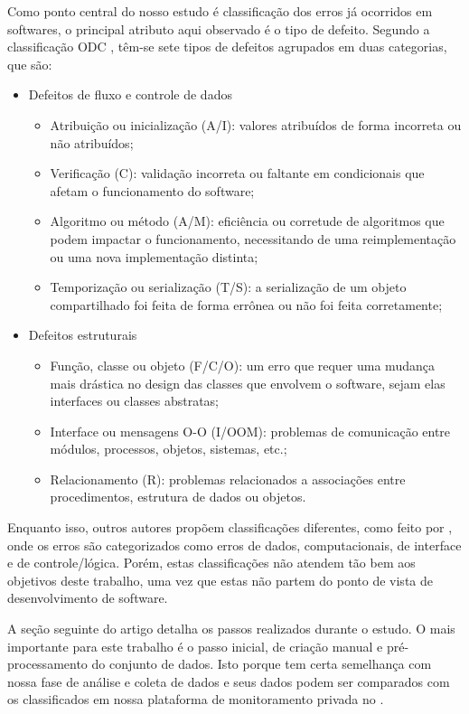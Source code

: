 Como ponto central do nosso estudo é classificação dos erros já ocorridos em softwares, o principal atributo aqui observado é o tipo de defeito. Segundo a classificação ODC \cite{ibm_odc}, têm-se sete tipos de defeitos agrupados em duas categorias, que são:

\begin{itemize}
    \item Defeitos de fluxo e controle de dados
    \begin{itemize}
        \item Atribuição ou inicialização (A/I): valores atribuídos de forma incorreta ou não atribuídos;
        \item Verificação (C): validação incorreta ou faltante em condicionais que afetam o funcionamento do software;
        \item Algoritmo ou método (A/M): eficiência ou corretude de algoritmos que podem impactar o funcionamento, necessitando de uma reimplementação ou uma nova implementação distinta;
        \item Temporização ou serialização (T/S): a serialização de um objeto compartilhado foi feita de forma errônea ou não foi feita corretamente;
    \end{itemize}
    \item Defeitos estruturais
    \begin{itemize}
        \item Função, classe ou objeto (F/C/O): um erro que requer uma mudança mais drástica no design das classes que envolvem o software, sejam elas interfaces ou classes abstratas;
        \item Interface ou mensagens O-O (I/OOM): problemas de comunicação entre módulos, processos, objetos, sistemas, etc.;
        \item Relacionamento (R): problemas relacionados a associações entre procedimentos, estrutura de dados ou objetos.
    \end{itemize}
\end{itemize}

Enquanto isso, outros autores propõem classificações diferentes, como feito por \cite{ast_based_aproach_to_classifying_defects}, onde os erros são categorizados como erros de dados, computacionais, de interface e de controle/lógica. Porém, estas classificações não atendem tão bem aos objetivos deste trabalho, uma vez que estas não partem do ponto de vista de desenvolvimento de software.

A seção seguinte do artigo detalha os passos realizados durante o estudo. O mais importante para este trabalho é o passo inicial, de criação manual e pré-processamento do conjunto de dados. Isto porque tem certa semelhança com nossa fase de análise e coleta de dados e seus dados podem ser comparados com os classificados em nossa plataforma de monitoramento privada no .

